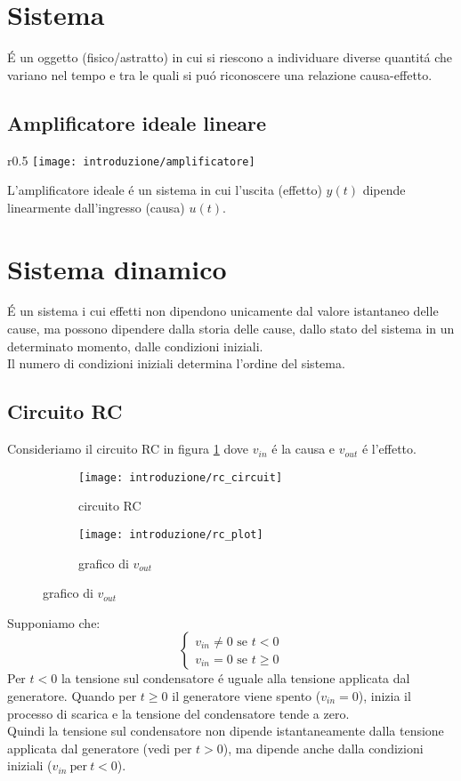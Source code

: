 \documentclass[../main.tex]{subfiles}
\begin{document}
	\section{Sistema}
		\'E un oggetto (fisico/astratto) in cui si riescono a individuare diverse quantit\'a che variano nel tempo e tra le quali si pu\'o riconoscere una relazione causa-effetto.

	\subsection{Amplificatore ideale lineare}
		\begin{wrapfigure}{r}{0.5\linewidth}%
			\vspace{-40pt}
			\texttt{[image: introduzione/amplificatore]}
		\end{wrapfigure}
		L'amplificatore ideale \'e un sistema in cui l'uscita (effetto) $y(t)$ dipende linearmente dall'ingresso (causa) $u(t)$.
		
	\section{Sistema dinamico}
		\'E un sistema i cui effetti non dipendono unicamente dal valore istantaneo delle cause, ma possono dipendere dalla storia delle cause, dallo stato del sistema in un determinato momento, dalle condizioni iniziali.\\
		Il numero di condizioni iniziali determina l'ordine del sistema.
		
	\subsection{Circuito RC} 
		Consideriamo il circuito RC in figura \ref{circuit:rc} dove $v_{in}$ \'e la causa e $v_{out}$ \'e l'effetto.
		\begin{figure}[h!]
			\centering
			\begin{subfigure}{0.48\linewidth}
				\texttt{[image: introduzione/rc\_circuit]}
				\caption{circuito RC}
				\label{circuit:rc}
			\end{subfigure}
			\begin{subfigure}{0.48\linewidth}
				\texttt{[image: introduzione/rc\_plot]}
				\caption{grafico di $v_{out}$}
				\label{graph:rc}
			\end{subfigure}
		\end{figure}
		\newpage
		Supponiamo che: 
		\[
			\begin{cases}
				v_{in}\neq0 \mbox{ se } t<0\\
				v_{in}=0 \mbox{ se } t\geq0
			\end{cases}
		\]
		Per $ t<0 $ la tensione sul condensatore \'e uguale alla tensione applicata dal generatore. Quando per $ t\geq0 $ il generatore viene spento ($ v_{in}=0 $), inizia il processo di scarica e la tensione del condensatore tende a zero.\\
		Quindi la tensione sul condensatore non dipende istantaneamente dalla tensione applicata dal generatore (vedi per $ t>0 $), ma dipende anche dalla condizioni iniziali ($ v_{in}\ \mbox{per}\ t<0$).
\end{document}
